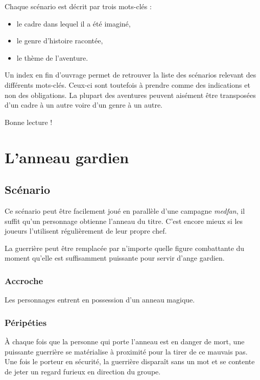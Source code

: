 \documentclass[a5paper,pagesize,10pt,bibtotoc,pointlessnumbers,
normalheadings,DIV=9,twoside=false]{scrbook}
\begin{document}
Chaque scénario est décrit par trois mots-clés :
\begin{itemize}
	\item le cadre dans lequel il a été imaginé,
	\item le genre d'histoire racontée,
	\item le thème de l'aventure.
\end{itemize}

Un index en fin d'ouvrage permet de retrouver la liste des scénarios relevant des différents mots-clés.
Ceux-ci sont toutefois à prendre comme des indications et non des obligations.
La plupart des aventures peuvent aisément être transposées d'un cadre à un autre voire d'un genre à un autre.

Bonne lecture !

\chapter{L'anneau gardien}

\section{Scénario}

Ce scénario peut être facilement joué en parallèle d'une campagne \emph{medfan}, il suffit qu'un personnage obtienne l'anneau du titre.
C'est encore mieux si les joueurs l'utilisent régulièrement de leur propre chef.

La guerrière peut être remplacée par n'importe quelle figure combattante du moment qu'elle est suffisamment puissante pour servir d'ange gardien.

\subsection*{Accroche}

Les personnages entrent en possession d'un anneau magique.

\subsection*{Péripéties}

À chaque fois que la personne qui porte l'anneau est en danger de mort, une puissante guerrière se matérialise à proximité pour la tirer de ce mauvais pas.
Une fois le porteur en sécurité, la guerrière disparaît sans un mot et se contente de jeter un regard furieux en direction du groupe.
\end{document}
